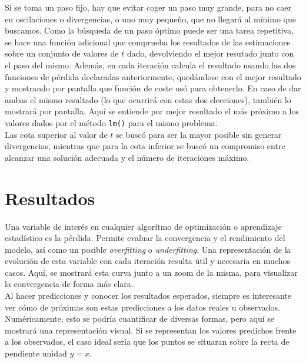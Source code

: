 \documentclass[11pt]{opticajnl}
\begin{document}
Si se toma un paso fijo, hay que evitar coger un paso muy grande, para no caer en oscilaciones o divergencias, o uno muy pequeño, que no llegará al mínimo que buscamos. Como la búsqueda de un paso óptimo puede ser una tarea repetitiva, se hace una función adicional que comprueba los resultados de las estimaciones sobre un conjunto de valores de $t$ dado, devolviendo el mejor resutado junto con el paso del mismo. Además, en cada iteración calcula el resultado usando las dos funciones de pérdida declaradas anteriormente, quedándose con el mejor resultado y mostrando por pantalla que función de coste usó para obtenerlo. En caso de dar ambas el mismo resultado (lo que ocurrirá con estas dos elecciones), también lo mostrará por pantalla. Aquí se entiende por mejor resultado el más próximo a los valores dados por el método \texttt{lm()} para el mismo problema. \\

Las cota superior al valor de $t$ se buscó para ser la mayor posible sin generar divergencias, mientras que para la cota inferior se buscó un compromiso entre alcanzar una solución adecuada y el número de iteraciones máximo. 

\section{Resultados}

Una variable de interés en cualquier algorítmo de optimización o aprendizaje estadístico es la pérdida. Permite evaluar la convergencia y el rendimiento del modelo, así como un posible \textit{overfitting} o \textit{underfitting}. Una representación de la evolución de esta variable con cada iteración resulta útil y necesaria en muchos casos. Aquí, se mostrará esta curva junto a un zoom de la misma, para visualizar la convergencia de forma más clara. \\

Al hacer predicciones y conocer los resultados esperados, siempre es interesante ver cómo de próximas son estas predicciones a los datos reales u observados. Numéricamente, esto se podría cuantificar de diversas formas, pero aquí se mostrará una representación visual. Si se representan los valores predichos frente a los observados, el caso ideal sería que los puntos se situaran sobre la recta de pendiente unidad $y = x$. \\
\end{document}
